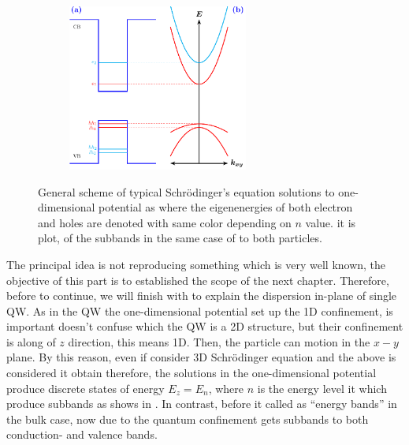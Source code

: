 \begin{figure}
	\begin{subfigure}{\textwidth}
		\centering
		\includegraphics[width=0.65\textwidth]{../figures/chapter-1/heterostructures/out/qw2}
		\label{subfig:subsection-1.2-single-quantum-well-scheme2-a)}
		\label{subfig:subsection-1.2-single-quantum-well-scheme2-b)}
	\end{subfigure}
	\caption{General scheme of typical Schrödinger's equation solutions to one-dimensional potential as  where the eigenenergies of both electron and holes are denoted with same color depending on  $n$ value. it is plot, of the subbands in  the same case of   to both particles.  }
	\label{fig:subsection-1.2-single-quantum-well-scheme2}
\end{figure}

The principal idea is not reproducing something which is very well known, the objective of this part is to established the scope of the next chapter. Therefore,  before to continue, we will finish with to explain the dispersion in-plane of single QW. As in the QW the one-dimensional potential set up the 1D confinement, is important doesn't confuse which the QW is a 2D structure, but their confinement is along of $z$ direction, this means 1D. Then, the particle can motion in the $x-y$ plane. By this reason, even if consider 3D Schrödinger equation and  the above is considered it obtain 
therefore, the solutions in the one-dimensional potential produce discrete states of energy $E_{z}=E_{n}$\cite{harrison2016quantum}, where $n$ is the energy level it which produce  subbands as shows in . In contrast, before it called as ``energy bands'' in the bulk case, now due to the quantum confinement gets subbands to both conduction- and valence bands.

